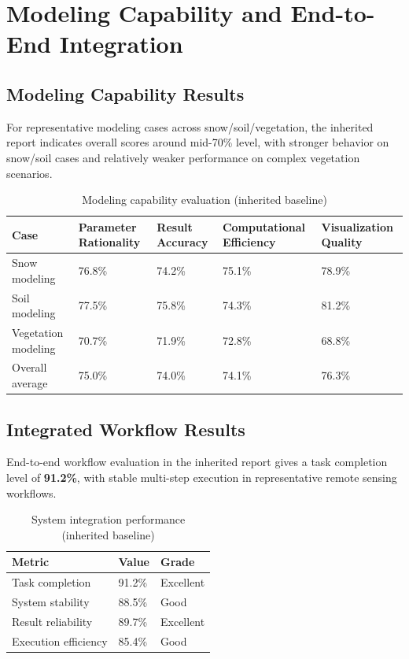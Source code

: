 \section{Modeling Capability and End-to-End Integration}
\label{sec:test-e2e}

\subsection{Modeling Capability Results}
For representative modeling cases across snow/soil/vegetation, the inherited report indicates overall scores around mid-70\% level, with stronger behavior on snow/soil cases and relatively weaker performance on complex vegetation scenarios.

\begin{table}[htbp]
	\centering
	\caption{Modeling capability evaluation (inherited baseline)}
	\label{tab:modeling-eval}
	\begin{tabular}{lllll}
		\hline
		Case & Parameter Rationality & Result Accuracy & Computational Efficiency & Visualization Quality \\
		\hline
		Snow modeling & 76.8\% & 74.2\% & 75.1\% & 78.9\% \\
		Soil modeling & 77.5\% & 75.8\% & 74.3\% & 81.2\% \\
		Vegetation modeling & 70.7\% & 71.9\% & 72.8\% & 68.8\% \\
		Overall average & 75.0\% & 74.0\% & 74.1\% & 76.3\% \\
		\hline
	\end{tabular}
\end{table}

\subsection{Integrated Workflow Results}
End-to-end workflow evaluation in the inherited report gives a task completion level of \textbf{91.2\%}, with stable multi-step execution in representative remote sensing workflows.

\begin{table}[htbp]
	\centering
	\caption{System integration performance (inherited baseline)}
	\label{tab:integration-eval}
	\begin{tabular}{lll}
		\hline
		Metric & Value & Grade \\
		\hline
		Task completion & 91.2\% & Excellent \\
		System stability & 88.5\% & Good \\
		Result reliability & 89.7\% & Excellent \\
		Execution efficiency & 85.4\% & Good \\
		\hline
	\end{tabular}
\end{table}


